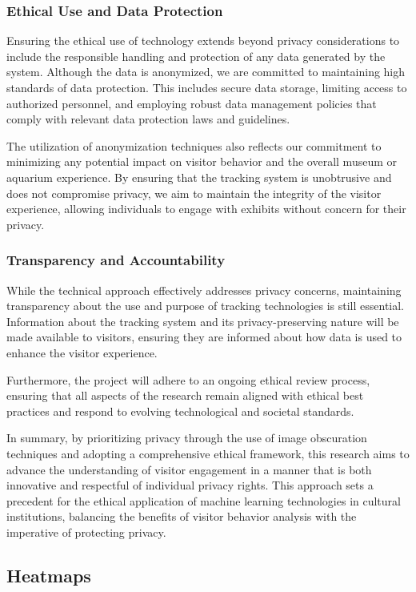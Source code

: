 \subsubsection{Ethical Use and Data Protection}
Ensuring the ethical use of technology extends beyond privacy considerations to include the responsible handling and protection of any data generated by the system. Although the data is anonymized, we are committed to maintaining high standards of data protection. This includes secure data storage, limiting access to authorized personnel, and employing robust data management policies that comply with relevant data protection laws and guidelines. 

The utilization of anonymization techniques also reflects our commitment to minimizing any potential impact on visitor behavior and the overall museum or aquarium experience. By ensuring that the tracking system is unobtrusive and does not compromise privacy, we aim to maintain the integrity of the visitor experience, allowing individuals to engage with exhibits without concern for their privacy.

\subsubsection{Transparency and Accountability}
While the technical approach effectively addresses privacy concerns, maintaining transparency about the use and purpose of tracking technologies is still essential. Information about the tracking system and its privacy-preserving nature will be made available to visitors, ensuring they are informed about how data is used to enhance the visitor experience.

Furthermore, the project will adhere to an ongoing ethical review process, ensuring that all aspects of the research remain aligned with ethical best practices and respond to evolving technological and societal standards.

In summary, by prioritizing privacy through the use of image obscuration techniques and adopting a comprehensive ethical framework, this research aims to advance the understanding of visitor engagement in a manner that is both innovative and respectful of individual privacy rights. This approach sets a precedent for the ethical application of machine learning technologies in cultural institutions, balancing the benefits of visitor behavior analysis with the imperative of protecting privacy.


\subsection{Heatmaps}
\label{sec:heatmaps}

